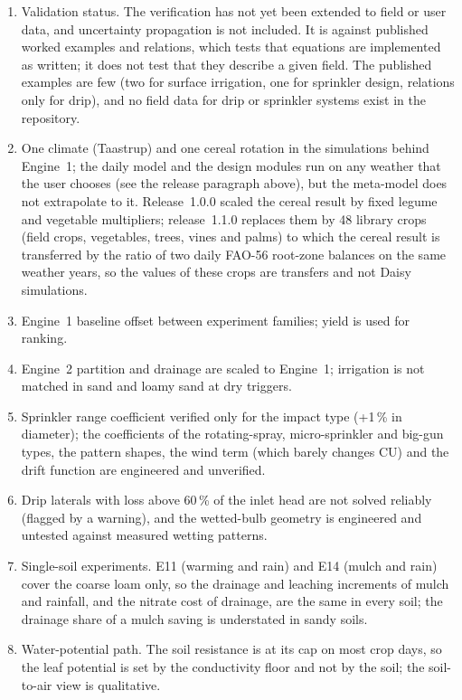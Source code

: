 \documentclass[preprint,12pt]{elsarticle}
\begin{document}
\begin{enumerate}[nosep]
\item Validation status. The verification has not yet been extended to field or user data, and uncertainty propagation is not included. It is against published worked examples and relations, which tests that equations are implemented as written; it does not test that they describe a given field. The published examples are few (two for surface irrigation, one for sprinkler design, relations only for drip), and no field data for drip or sprinkler systems exist in the repository.
\item One climate (Taastrup) and one cereal rotation in the simulations behind Engine~1; the daily model and the design modules run on any weather that the user chooses (see the release paragraph above), but the meta-model does not extrapolate to it. Release~1.0.0 scaled the cereal result by fixed legume and vegetable multipliers; release~1.1.0 replaces them by 48 library crops (field crops, vegetables, trees, vines and palms) to which the cereal result is transferred by the ratio of two daily FAO-56 root-zone balances on the same weather years, so the values of these crops are transfers and not Daisy simulations.
\item Engine~1 baseline offset between experiment families; yield is used for ranking.
\item Engine~2 partition and drainage are scaled to Engine~1; irrigation is not matched in sand and loamy sand at dry triggers.
\item Sprinkler range coefficient verified only for the impact type (+1\,\% in diameter); the coefficients of the rotating-spray, micro-sprinkler and big-gun types, the pattern shapes, the wind term (which barely changes CU) and the drift function are engineered and unverified.
\item Drip laterals with loss above 60\,\% of the inlet head are not solved reliably (flagged by a warning), and the wetted-bulb geometry is engineered and untested against measured wetting patterns.
\item Single-soil experiments. E11 (warming and rain) and E14 (mulch and rain) cover the coarse loam only, so the drainage and leaching increments of mulch and rainfall, and the nitrate cost of drainage, are the same in every soil; the drainage share of a mulch saving is understated in sandy soils.
\item Water-potential path. The soil resistance is at its cap on most crop days, so the leaf potential is set by the conductivity floor and not by the soil; the soil-to-air view is qualitative.

\end{enumerate}
\end{document}
